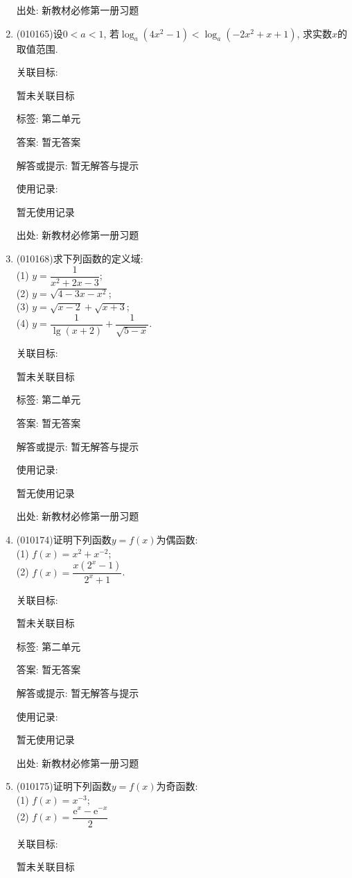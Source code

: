 \documentclass[10pt,a4paper]{article}
\begin{document}
\begin{enumerate}[1.]
出处: 新教材必修第一册习题
\item { (010165)}设$0<a<1$, 若$\log_a(4x^2-1)<\log_a(-2x^2+x+1)$, 求实数$x$的取值范围.


关联目标:

暂未关联目标



标签: 第二单元

答案: 暂无答案

解答或提示: 暂无解答与提示

使用记录:

暂无使用记录


出处: 新教材必修第一册习题
\item { (010168)}求下列函数的定义域:\\
(1) $y=\dfrac1{x^2+2x-3}$;\\
(2) $y=\sqrt{4-3x-x^2}$;\\
(3) $y=\sqrt{x-2}+\sqrt{x+3}$;\\
(4) $y=\dfrac 1{\lg(x+2)}+\dfrac 1{\sqrt{5-x}}$.


关联目标:

暂未关联目标



标签: 第二单元

答案: 暂无答案

解答或提示: 暂无解答与提示

使用记录:

暂无使用记录


出处: 新教材必修第一册习题
\item { (010174)}证明下列函数$y=f(x)$为偶函数:\\
(1) $f(x)=x^2+x^{-2}$;\\
(2) $f(x)=\dfrac{x(2^x-1)}{2^x+1}$.


关联目标:

暂未关联目标



标签: 第二单元

答案: 暂无答案

解答或提示: 暂无解答与提示

使用记录:

暂无使用记录


出处: 新教材必修第一册习题
\item { (010175)}证明下列函数$y=f(x)$为奇函数:\\
(1) $f(x)=x^{-3}$;\\
(2) $f(x)=\dfrac{\mathrm{e}^x-\mathrm{e}^{-x}}2$


关联目标:

暂未关联目标




\end{enumerate}
\end{document}
